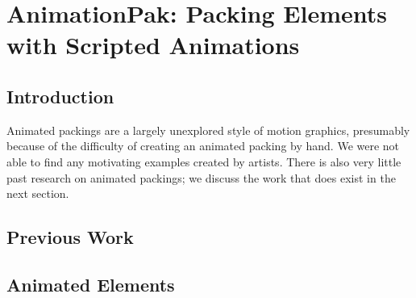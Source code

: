 \chapter{AnimationPak: Packing Elements with Scripted Animations}


\section{Introduction}
\label{animationpak_introduction}

Animated packings are a largely unexplored style
of motion graphics, presumably because of the difficulty of creating 
an animated packing by hand.  We were not able to find any motivating
examples created by artists.  There is also very little past research
on animated packings; we discuss the work that does exist in the next
section. 

\section{Previous Work}
\label{animationpak_previous_work}


\section{Animated Elements}
\label{animationpak_animated_element}

